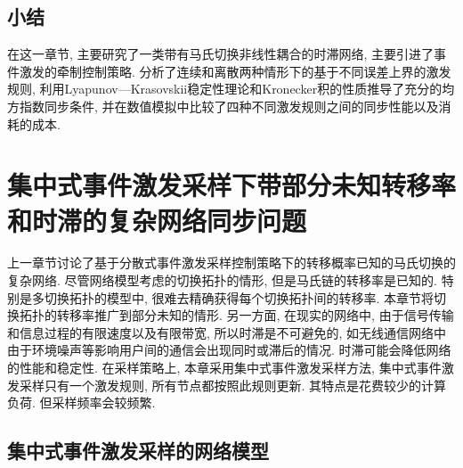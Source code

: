 \section{小结}
    在这一章节, 主要研究了一类带有马氏切换非线性耦合的时滞网络, 主要引进了事件激发的牵制控制策略. 分析了连续和离散两种情形下的基于不同误差上界的激发规则, 利用Lyapunov—Krasovskii稳定性理论和Kronecker积的性质推导了充分的均方指数同步条件, 并在数值模拟中比较了四种不同激发规则之间的同步性能以及消耗的成本.


\chapter{集中式事件激发采样下带部分未知转移率和时滞的复杂网络同步问题}
    上一章节讨论了基于分散式事件激发采样控制策略下的转移概率已知的马氏切换的复杂网络. 尽管网络模型考虑的切换拓扑的情形, 但是马氏链的转移率是已知的. 特别是多切换拓扑的模型中, 很难去精确获得每个切换拓扑间的转移率. 本章节将切换拓扑的转移率推广到部分未知的情形. 另一方面, 在现实的网络中, 由于信号传输和信息过程的有限速度以及有限带宽, 所以时滞是不可避免的, 如无线通信网络中由于环境噪声等影响用户间的通信会出现同时或滞后的情况. 时滞可能会降低网络的性能和稳定性. 在采样策略上, 本章采用集中式事件激发采样方法, 集中式事件激发采样只有一个激发规则, 所有节点都按照此规则更新. 其特点是花费较少的计算负荷. 但采样频率会较频繁.


\section{集中式事件激发采样的网络模型}

